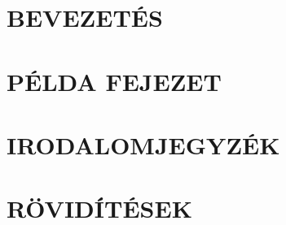 














\newpage
\tableofcontents
\newpage





\clearpage
\section{BEVEZETÉS}


\clearpage
\section{PÉLDA FEJEZET}













\clearpage
\section{IRODALOMJEGYZÉK}
\printbibliography[heading=none]

\clearpage
\renewcommand{\listfigurename}{ÁBRAJEGYZÉK}
\listoffigures

\clearpage
\renewcommand{\listtablename}{TÁBLAJEGYZÉK}
\listoftables

\clearpage
\section{RÖVIDÍTÉSEK}








